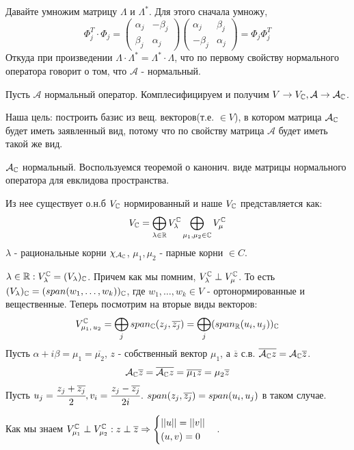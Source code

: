 Давайте умножим матрицу $\Lambda$ и $\Lambda^*$. Для этого сначала умножу, $$\Phi_j^T \cdot \Phi_j = \begin{pmatrix}
    \alpha_j &-\beta_j\\
    \beta_j & \alpha_j
\end{pmatrix} \begin{pmatrix}
    \alpha_j & \beta_j \\
    -\beta_j & \alpha_j
\end{pmatrix} = \Phi_j \Phi_j^T$$ Откуда при произведении $\Lambda \cdot \Lambda^* = \Lambda^* \cdot \Lambda$, что по первому свойству нормального оператора говорит о том, что $\mathcal{A}$ - нормальный.


Пусть $\mathcal{A}$ нормальный оператор. Комплесифицируем и получим $V \rightarrow{} V_{\mathbb{C}}, \mathcal{A}\rightarrow{} \mathcal{A}_{\mathbb{C}}$.  

Наша цель: построить базис из вещ. векторов(т.е. $\in V$), в котором матрица $\mathcal{A}_{\mathbb{C}}$ будет иметь заявленный вид, потому что по свойству матрица $\mathcal{A}$ будет иметь такой же вид.

$\mathcal{A}_{\mathbb{C}}$ нормальный. Воспользуемся теоремой о канонич. виде матрицы нормального оператора для евклидова пространства.

Из нее существует о.н.б $V_{\mathbb{C}}$ нормированный и наше $V_{\mathbb{C}}$ представляется как:
$$V_{\mathbb{C}} = \bigoplus\limits_{\lambda \in \mathbb{R}} V_\lambda^{\mathbb{C}}\bigoplus\limits_{\mu_1,\mu_2 \in \mathbb{C}}V_\mu^{\mathbb{C}}$$
$\lambda$ - рациональные корни $\chi_{\mathcal{A}_{\mathbb{C}}}$, $\mu_1,\mu_2$ - парные корни $\in C$.

$\lambda \in \mathbb{R}: V_\lambda^{\mathbb{C}} = (V_\lambda)_{\mathbb{C}}$. Причем как мы помним, $V_\lambda^{\mathbb{C}} \perp V_\mu^{\mathbb{C}}$. То есть $(V_\lambda)_{\mathbb{C}} = (span(w_1,\ldots,w_k))_{\mathbb{C}}$, где $w_1,\ldots,w_k  \in V$ - ортонормированные и вещественные. Теперь посмотрим на вторые  виды векторов:
$$V_{\mu_1,\,u_2}^{\mathbb{C}} = \bigoplus\limits_j span_{\mathbb{C}} (z_j, \overline{z_j}) = \bigoplus\limits_j(span_{\mathbb{R}}(u_i,u_j))_{\mathbb{C}}$$
Пусть $\alpha + i\beta = \mu_1 = \overline{\mu_2}$, $z$ - собственный вектор $\mu_1$, а $\overline{z}$ с.в.  $\overline{\mathcal{A}_{\mathbb{C}} z} = \mathcal{A}_{\mathbb{C}} \overline{z}$.
$$\mathcal{A}_{\mathbb{C}} \overline{z} = \overline{\mathcal{A}_{\mathbb{C}} z} = \overline{\mu_1 z} = \mu_2\overline{z}$$
Пусть $u_j =\cfrac{z_j + \overline{z_j}}{2}, v_i = \cfrac{z_j -\overline{z_j}}{2i}$. $span (z_j, \overline{z_j}) = span(u_i,u_j)$ в таком случае.

Как мы знаем $V_{\mu_1}^{\mathbb{C}}\perp V_{\mu_2}^{\mathbb{C}}: z \perp \overline{z} \Rightarrow \begin{cases}
    ||u || = ||v||\\
    (u,v) = 0
\end{cases}$.

